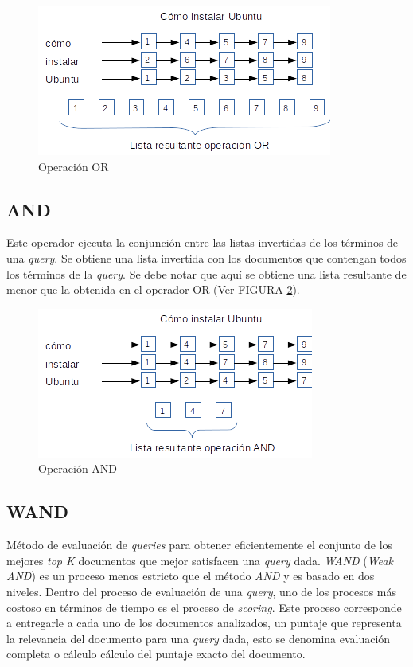 \begin{figure}[tp]
\centering
\includegraphics[scale=.75]{images/ORoperation.png}
\caption{Operaci\'on OR}
\label{fig:ORoperation}
\end{figure}

\subsection{AND}
\label{marco:and}
Este operador ejecuta la conjunción entre las listas invertidas de los términos de una \textit{query}. Se obtiene una lista invertida con los documentos que contengan todos los términos de la \textit{query}. Se debe notar que aquí se obtiene una lista resultante de menor que la obtenida en el operador OR (Ver FIGURA \ref{fig:ANDoperation}).

\begin{figure}[tp]
\centering
\includegraphics[scale=.75]{images/ANDoperation.png}
\caption{Operaci\'on AND}
\label{fig:ANDoperation}
\end{figure}


\subsection{WAND}
\label{marco:wand}
Método de evaluación de \textit{queries} para obtener eficientemente el conjunto de los mejores \textit{top K} documentos que mejor satisfacen una \textit{query} dada. \textit{WAND} \citep{Broder:2003} (\textit{Weak AND}) es un proceso menos estricto que el método \textit{AND} y es basado en dos niveles. Dentro del proceso de evaluación de una \textit{query}, uno de los procesos más costoso en términos de tiempo es el proceso de \textit{scoring}. Este proceso corresponde a entregarle a cada uno de los documentos analizados, un puntaje que representa la relevancia del documento para una \textit{query} dada, esto se denomina evaluación completa o cálculo cálculo del puntaje exacto del documento.

